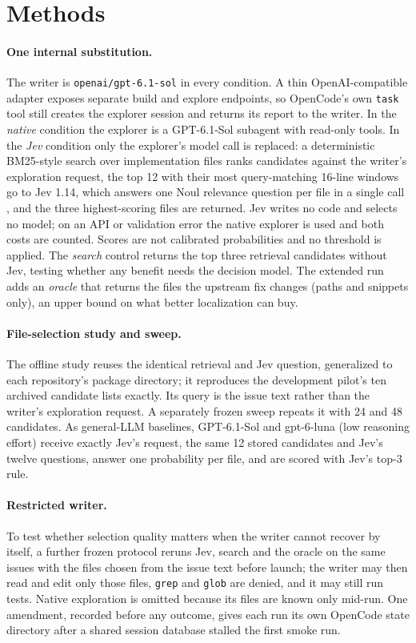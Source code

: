 \documentclass{article}
\begin{document}
\section{Methods}

\paragraph{One internal substitution.}
The writer is \texttt{openai/gpt-6.1-sol} in every condition. A thin OpenAI-compatible adapter exposes separate build and explore endpoints, so OpenCode's own \texttt{task} tool still creates the explorer session and returns its report to the writer. In the \emph{native} condition the explorer is a GPT-6.1-Sol subagent with read-only tools. In the \emph{Jev} condition only the explorer's model call is replaced: a deterministic BM25-style search over implementation files ranks candidates against the writer's exploration request, the top 12 with their most query-matching 16-line windows go to Jev 1.14, which answers one Noul relevance question per file in a single call \citep{jev}, and the three highest-scoring files are returned. Jev writes no code and selects no model; on an API or validation error the native explorer is used and both costs are counted. Scores are not calibrated probabilities and no threshold is applied. The \emph{search} control returns the top three retrieval candidates without Jev, testing whether any benefit needs the decision model. The extended run adds an \emph{oracle} that returns the files the upstream fix changes (paths and snippets only), an upper bound on what better localization can buy.

\paragraph{File-selection study and sweep.}
The offline study reuses the identical retrieval and Jev question, generalized to each repository's package directory; it reproduces the development pilot's ten archived candidate lists exactly. Its query is the issue text rather than the writer's exploration request. A separately frozen sweep repeats it with 24 and 48 candidates. As general-LLM baselines, GPT-6.1-Sol and gpt-6-luna (low reasoning effort) receive exactly Jev's request, the same 12 stored candidates and Jev's twelve questions, answer one probability per file, and are scored with Jev's top-3 rule.

\paragraph{Restricted writer.}
To test whether selection quality matters when the writer cannot recover by itself, a further frozen protocol reruns Jev, search and the oracle on the same \RsValid{} issues with the files chosen from the issue text before launch; the writer may then read and edit only those files, \texttt{grep} and \texttt{glob} are denied, and it may still run tests. Native exploration is omitted because its files are known only mid-run. One amendment, recorded before any outcome, gives each run its own OpenCode state directory after a shared session database stalled the first smoke run.
\end{document}

